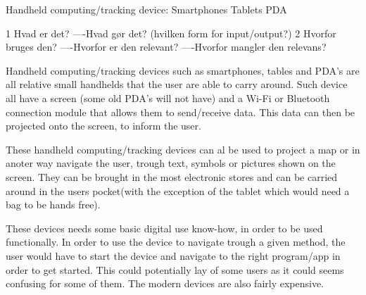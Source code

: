  Handheld computing/tracking device:
 	 Smartphones
 	 Tablets
 	 PDA
 	 
 	 
 	 1 Hvad er det?
 	 ----Hvad gør det? (hvilken form for input/output?)
 	 2 Hvorfor bruges den?
 	 ----Hvorfor er den relevant?
 	 ----Hvorfor mangler den relevans?
 	 
Handheld computing/tracking devices such as smartphones, tables and PDA's are all relative small handhelds that the user are able to carry around. Such device all have a screen (some old PDA's will not have) and a Wi-Fi or Bluetooth connection module that allows them to send/receive data. This data can then be projected onto the screen, to inform the user.


These handheld computing/tracking devices can al be used to project a map or in anoter way navigate the user, trough text, symbols or pictures shown on the screen. They can be brought in the most electronic stores and can be carried around in the users pocket(with the exception of the tablet which would need a bag to be hands free). 

These devices needs some basic digital use know-how, in order to be used functionally. In order to use the device to navigate trough a given method, the user would have to start the device and navigate to the right program/app in order to get started. This could potentially lay of some users as it could seems confusing for some of them. The modern devices are also fairly expensive. 